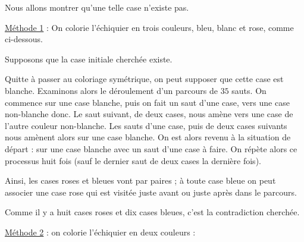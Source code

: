 \begin{sol}
	Nous allons montrer qu'une telle case n'existe pas.

	\underline{Méthode 1} : On colorie l'échiquier en trois couleurs, bleu, blanc et rose, comme ci-dessous.
	

	Supposons que la case initiale cherchée existe.


	Quitte à passer au coloriage symétrique, on peut supposer que cette case est blanche. Examinons alors le déroulement d'un parcours de $35$ sauts. On commence sur une case blanche, puis on fait un saut d'une case, vers une case non-blanche donc. Le saut suivant, de deux cases, nous amène vers une case de l'autre couleur non-blanche. Les sauts d'une case, puis de deux cases suivants nous amènent alors sur une case blanche. On est alors revenu à la situation de départ : sur une case blanche avec un saut d'une case à faire. On répète alors ce processus huit fois (sauf le dernier saut de deux cases la dernière fois).

	Ainsi, les cases roses et bleues vont par paires ; à toute case bleue on peut associer une case rose qui est visitée juste avant ou juste après dans le parcours. 
	
	Comme il y a huit cases roses et dix cases bleues, c'est la contradiction cherchée.


	\underline{Méthode 2} : on colorie l'échiquier en deux couleurs :
	


\end{sol}
